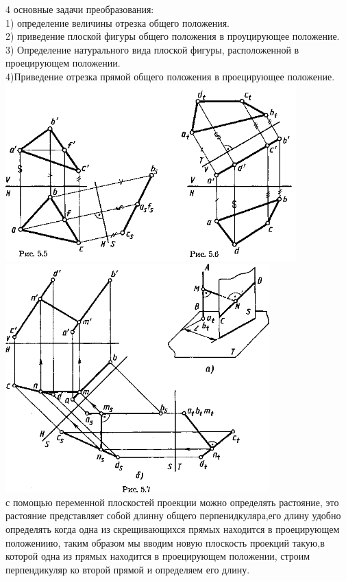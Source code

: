 \documentclass[a4paper, 12pt]{article}
\begin{document}
4 основные задачи преобразования:\\
1) определение величины отрезка общего положения.\\
2) приведение плоской фигуры общего положения в проуцирующее положение.\\
3) Определение натурального вида плоской фигуры, расположенной в проецирующем положении.\\
4)Приведение отрезка прямой общего положения в проецирующее положение.
\includegraphics{img/522.png}\\
\includegraphics{img/523.png}\\
с помощью переменной плоскостей проекции можно определять растояние, это растояние представляет собой длинну общего перпенидкуляра,его длину удобно определять когда одна из скрещивающихся прямых находится в проецирующем положениию, таким образом мы вводим новую плоскость проекций такую,в которой одна из прямых находится в проецирующем положении, строим перпендикуляр ко второй прямой и определяем его длину.\\
\end{document}
